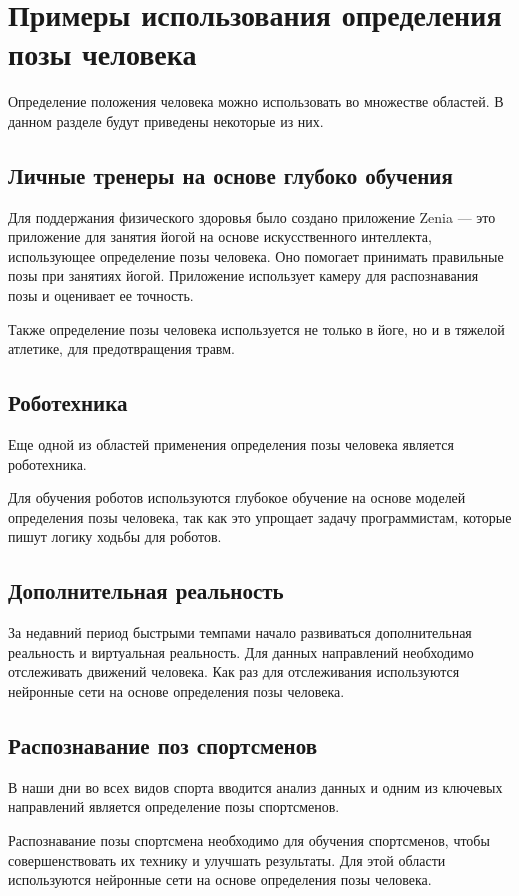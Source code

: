 \section{Примеры использования определения позы человека}

Определение положения человека можно использовать во множестве областей. В данном разделе будут приведены некоторые из них.

\subsection{Личные тренеры на основе глубоко обучения}

Для поддержания физического здоровья было создано приложение Zenia \cite{Zenia} --- это приложение для занятия йогой на основе искусственного интеллекта, использующее определение позы человека.
Оно помогает принимать правильные позы при занятиях йогой.
Приложение использует камеру для распознавания позы и оценивает ее точность.

Также определение позы человека используется не только в йоге, но и в тяжелой атлетике, для предотвращения травм.

\subsection{Роботехника}

Еще одной из областей применения определения позы человека является роботехника.

Для обучения роботов используются глубокое обучение на основе моделей определения позы человека, так как это упрощает задачу программистам, которые пишут логику ходьбы для роботов. 

\subsection{Дополнительная реальность}

За недавний период быстрыми темпами начало развиваться дополнительная реальность и виртуальная реальность. Для данных направлений необходимо отслеживать движений человека. Как раз для отслеживания используются нейронные сети на основе определения позы человека.

\subsection{Распознавание поз спортсменов}

В наши дни во всех видов спорта вводится анализ данных и одним из ключевых направлений является определение позы спортсменов.

Распознавание позы спортсмена необходимо для обучения спортсменов, чтобы совершенствовать их технику и улучшать результаты. Для этой области используются нейронные сети на основе определения позы человека.